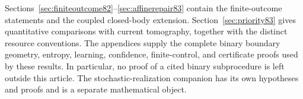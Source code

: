 Sections~\ref{sec:finiteoutcome82}--\ref{sec:affinerepair83} contain the
finite-outcome statements and the coupled closed-body extension.
Section~\ref{sec:priority83} gives quantitative comparisons with current
tomography, together with the distinct resource conventions.  The
appendices supply the complete binary boundary geometry, entropy,
learning, confidence, finite-control, and certificate proofs used by
these results.  In particular, no proof of a cited binary subprocedure
is left outside this article.  The stochastic-realization companion has
its own hypotheses and proofs and is a separate mathematical object.
